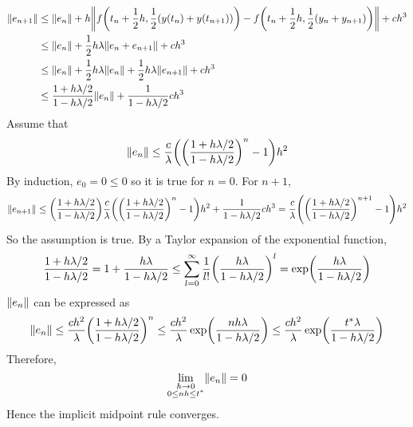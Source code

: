 \documentclass[10pt]{report}
\DeclarePairedDelimiter\autoparen{(}{)}
\newcommand{\pa}[1]{\autoparen*{#1}}
\DeclarePairedDelimiter\autodvert{\Vert}{\Vert}
\newcommand{\norm}[1]{\autodvert*{#1}}
\begin{document}
\begin{enumerate}
	\begin{align*}
	\norm{e_{n+1}} &\le \norm{e_n} + h\norm{f\pa{t_n + \frac{1}{2}h, \frac{1}{2}(y(t_n) + y(t_{n+1}))} - f\pa{t_n + \frac{1}{2}h, \frac{1}{2}(y_n + y_{n+1})}} + ch^3\\
	&\le \norm{e_n} + \frac{1}{2}h\lambda \norm{e_n + e_{n+1}} + ch^3\\
	&\le \norm{e_n} + \frac{1}{2}h\lambda \norm{e_n} + \frac{1}{2}h\lambda\norm{e_{n+1}} + ch^3\\
	&\le \frac{1+h\lambda/2}{1-h\lambda/2} \norm{e_n} + \frac{1}{1-h\lambda/2}ch^3
	\end{align*}
	Assume that
	\[
	\norm{e_n} \le \frac{c}{\lambda} \pa{\pa{\frac{1+h\lambda/2}{1-h\lambda/2}}^n - 1}h^2
	\]
	By induction, $e_0 = 0 \le 0$ so it is true for $n=0$. For $n+1$,
	\[
	\norm{e_{n+1}} \le \pa{\frac{1+h\lambda/2}{1-h\lambda/2}} \frac{c}{\lambda} \pa{\pa{\frac{1+h\lambda/2}{1-h\lambda/2}}^n - 1}h^2 + \frac{1}{1-h\lambda/2}ch^3 = \frac{c}{\lambda} \pa{\pa{\frac{1+h\lambda/2}{1-h\lambda/2}}^{n+1} - 1}h^2
	\]
	So the assumption is true. By a Taylor expansion of the exponential function,
	\[
	\frac{1+h\lambda/2}{1-h\lambda/2} 
	= 1+\frac{h\lambda}{1-h\lambda/2}
	\le \sum_{l=0}^{\infty} \frac{1}{l!} \pa{\frac{h\lambda}{1-h\lambda/2}}^l
	= \exp\pa{\frac{h\lambda}{1-h\lambda/2}}
	\]
	$\norm{e_n}$ can be expressed as 
	\[
	\norm{e_n} 
	\le \frac{ch^2}{\lambda} \pa{\frac{1+h\lambda/2}{1-h\lambda/2}}^n
	\le \frac{ch^2}{\lambda} \exp\pa{\frac{nh\lambda}{1-h\lambda/2}}
	\le \frac{ch^2}{\lambda} \exp\pa{\frac{t^*\lambda}{1-h\lambda/2}}
	\]
	Therefore,
	\[
	\lim\limits_{\substack{h\to 0\\0\le nh\le t^*}} \norm{e_n} = 0
	\]
	Hence the implicit midpoint rule converges.
	

\end{enumerate}
\end{document}
